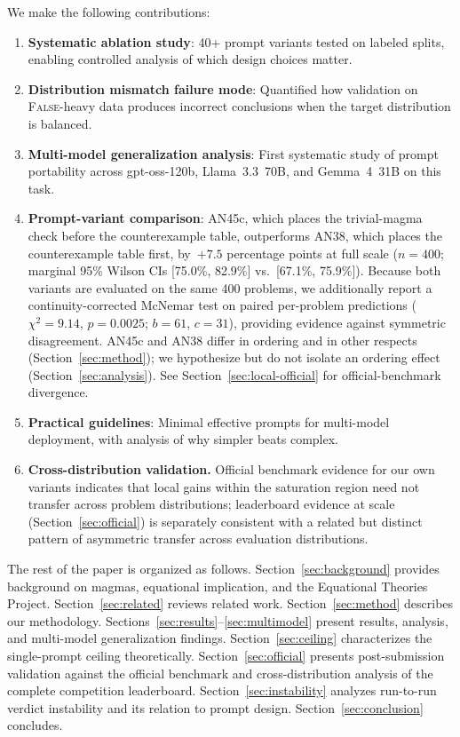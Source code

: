\documentclass[11pt]{article}
\begin{document}
We make the following contributions:
\begin{enumerate}
  \item \textbf{Systematic ablation study}: 40+ prompt variants tested
    on labeled splits, enabling controlled analysis of which design
    choices matter.
  \item \textbf{Distribution mismatch failure mode}: Quantified how
    validation on \textsc{False}-heavy data produces incorrect
    conclusions when the target distribution is balanced.
  \item \textbf{Multi-model generalization analysis}: First systematic
    study of prompt portability across gpt-oss-120b, Llama~3.3~70B,
    and Gemma~4~31B on this task.
  \item \textbf{Prompt-variant comparison}: AN45c, which places the
    trivial-magma check before the counterexample table, outperforms
    AN38, which places the counterexample table first, by~$+7.5$
    percentage points at full scale ($n=400$; marginal 95\% Wilson CIs
    [75.0\%, 82.9\%] vs.\ [67.1\%, 75.9\%]). Because both variants are
    evaluated on the same 400 problems, we additionally report a
    continuity-corrected McNemar test on paired per-problem predictions
    ($\chi^2=9.14$, $p=0.0025$; $b=61$, $c=31$), providing evidence
    against symmetric disagreement. AN45c and AN38 differ in ordering
    and in other respects (Section~\ref{sec:method}); we hypothesize but
    do not isolate an ordering effect (Section~\ref{sec:analysis}).
    See Section~\ref{sec:local-official} for official-benchmark divergence.
  \item \textbf{Practical guidelines}: Minimal effective prompts for
    multi-model deployment, with analysis of why simpler beats complex.
  \item \textbf{Cross-distribution validation.} Official benchmark evidence
    for our own variants indicates that local gains within the saturation
    region need not transfer across problem distributions; leaderboard
    evidence at scale (Section~\ref{sec:official}) is separately consistent
    with a related but distinct pattern of asymmetric transfer across
    evaluation distributions.
\end{enumerate}

The rest of the paper is organized as follows. Section~\ref{sec:background}
provides background on magmas, equational implication, and the
Equational Theories Project. Section~\ref{sec:related} reviews related
work. Section~\ref{sec:method} describes our methodology.
Sections~\ref{sec:results}--\ref{sec:multimodel} present results,
analysis, and multi-model generalization findings.
Section~\ref{sec:ceiling} characterizes the single-prompt ceiling
theoretically. Section~\ref{sec:official} presents post-submission
validation against the official benchmark and cross-distribution
analysis of the complete competition leaderboard.
Section~\ref{sec:instability} analyzes run-to-run verdict instability and its relation to prompt design.
Section~\ref{sec:conclusion} concludes.
\end{document}

